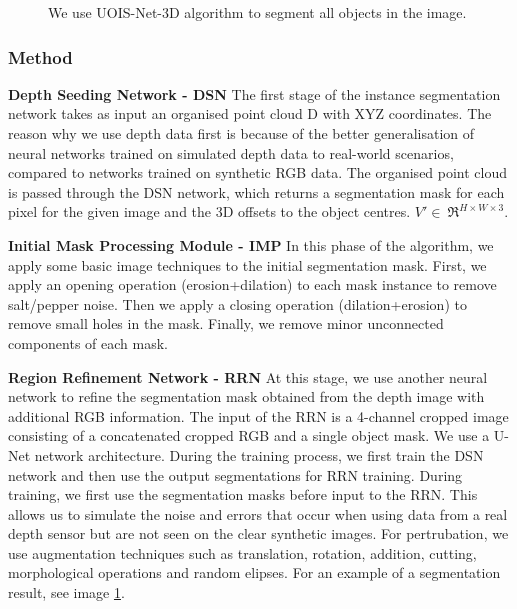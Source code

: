 \documentclass[10pt,twocolumn,letterpaper]{article}
\begin{document}
\begin{figure}
\begin{center}
\end{center}
   \caption{We use UOIS-Net-3D algorithm to segment all objects in the image.}
\label{fig:UOIS-example}
\end{figure}

\subsubsection{Method}

\textbf{Depth Seeding Network - DSN}
The first stage of the instance segmentation network takes as input an organised point cloud D with XYZ coordinates. The reason why we use depth data first is because of the better generalisation of neural networks trained on simulated depth data to real-world scenarios, compared to networks trained on synthetic RGB data. The organised point cloud is passed through the DSN network, which returns a segmentation mask for each pixel for the given image and the 3D offsets to the object centres. \(V'\in\ \Re^{H \times W \times 3}\).

\textbf{Initial Mask Processing Module - IMP }
In this phase of the algorithm, we apply some basic image techniques to the initial segmentation mask. First, we apply an opening operation (erosion+dilation) to each mask instance to remove salt/pepper noise. Then we apply a closing operation (dilation+erosion) to remove small holes in the mask. Finally, we remove minor unconnected components of each mask. 

\textbf{Region Refinement Network - RRN}
At this stage, we use another neural network to refine the segmentation mask obtained from the depth image with additional RGB information. The input of the RRN is a 4-channel cropped image consisting of a concatenated cropped RGB and a single object mask. We use a U-Net \cite{u-net} network architecture.
During the training process, we first train the DSN network and then use the output segmentations for RRN training. During training, we first use the segmentation masks before input to the RRN. This allows us to simulate the noise and errors that occur when using data from a real depth sensor but are not seen on the clear synthetic images. For pertrubation, we use augmentation techniques such as translation, rotation, addition, cutting, morphological operations and random elipses. For an example of a segmentation result, see image \ref{fig:UOIS-example}. 
\end{document}
